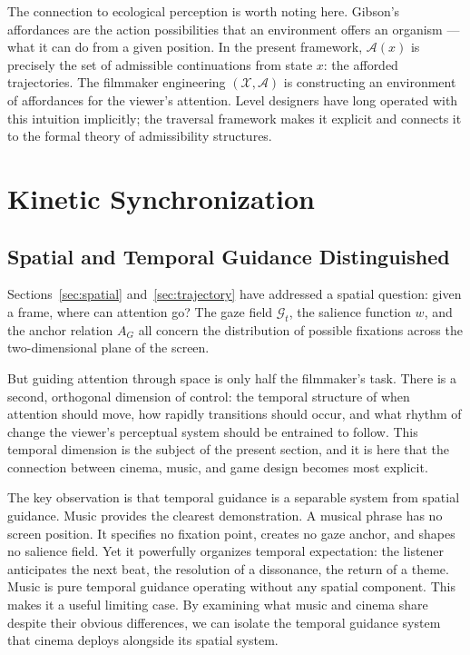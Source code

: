 \documentclass[12pt, a4paper]{article}
\theoremstyle{plain}
\theoremstyle{definition}
\theoremstyle{remark}
\newcommand{\X}{\mathcal{X}}
\newcommand{\A}{\mathcal{A}}
\newcommand{\G}{\mathcal{G}}
\newcommand{\AG}{A_G}
\newcommand{\salience}{w}
\begin{document}
The connection to ecological perception is worth noting
here. Gibson's affordances \cite{gibson1979} are the
action possibilities that an environment offers an
organism --- what it can do from a given position. In the
present framework, $\A(x)$ is precisely the set of
admissible continuations from state $x$: the afforded
trajectories. The filmmaker engineering $(\X, \A)$ is
constructing an environment of affordances for the viewer's
attention. Level designers have long operated with this
intuition implicitly; the traversal framework makes it
explicit and connects it to the formal theory of admissibility
structures.

\section{Kinetic Synchronization}
\label{sec:kinetic}

\subsection{Spatial and Temporal Guidance Distinguished}
\label{subsec:spatiotemporal}

Sections~\ref{sec:spatial} and~\ref{sec:trajectory} have
addressed a spatial question: given a frame, where can
attention go? The gaze field $\G_t$, the salience function
$\salience$, and the anchor relation $\AG$ all concern the
distribution of possible fixations across the two-dimensional
plane of the screen.

But guiding attention through space is only half the
filmmaker's task. There is a second, orthogonal dimension of
control: the temporal structure of when attention should
move, how rapidly transitions should occur, and what rhythm
of change the viewer's perceptual system should be entrained
to follow. This temporal dimension is the subject of the
present section, and it is here that the connection between
cinema, music, and game design becomes most explicit.

The key observation is that temporal guidance is a separable
system from spatial guidance. Music provides the clearest
demonstration. A musical phrase has no screen position. It
specifies no fixation point, creates no gaze anchor, and
shapes no salience field. Yet it powerfully organizes
temporal expectation: the listener anticipates the next
beat, the resolution of a dissonance, the return of a
theme. Music is pure temporal guidance operating without any
spatial component. This makes it a useful limiting case. By
examining what music and cinema share despite their obvious
differences, we can isolate the temporal guidance system
that cinema deploys alongside its spatial system.
\end{document}
